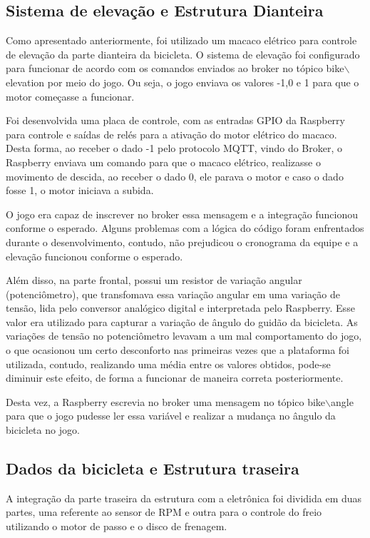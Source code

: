 \subsection{Sistema de elevação e Estrutura Dianteira}

Como apresentado anteriormente, foi utilizado um macaco elétrico para controle de elevação da parte dianteira da bicicleta. O sistema de elevação foi configurado para funcionar de acordo com os comandos enviados ao broker no tópico bike$\backslash$elevation por meio do jogo. Ou seja, o jogo enviava os valores -1,0 e 1 para que o motor começasse a funcionar.

Foi desenvolvida uma placa de controle, com as entradas GPIO da Raspberry para controle e saídas de relés para a ativação do motor elétrico do macaco. Desta forma, ao receber o dado -1 pelo protocolo MQTT, vindo do Broker, o Raspberry enviava um comando para que o macaco elétrico, realizasse o movimento de descida, ao receber o dado 0, ele parava o motor e caso o dado fosse 1, o motor iniciava a subida. 

O jogo era capaz de inscrever no broker essa mensagem e a integração funcionou conforme o esperado. Alguns problemas com a lógica do código foram enfrentados durante o desenvolvimento, contudo, não prejudicou o cronograma da equipe e a elevação funcionou conforme o esperado.

Além disso, na parte frontal, possui um resistor de variação angular (potenciômetro), que transfomava essa variação angular em uma variação de tensão, lida pelo conversor analógico digital e interpretada pelo Raspberry. Esse valor era utilizado para capturar a variação de ângulo do guidão da bicicleta. As variações de tensão no potenciômetro levavam a um mal comportamento do jogo, o que ocasionou um certo desconforto nas primeiras vezes que a plataforma foi utilizada, contudo, realizando uma média entre os valores obtidos, pode-se diminuir este efeito, de forma a funcionar de maneira correta posteriormente.

Desta vez, a Raspberry escrevia no broker uma mensagem no tópico bike$\backslash$angle para que o jogo pudesse ler essa variável e realizar a mudança no ângulo da bicicleta no jogo. 

\subsection{Dados da bicicleta e Estrutura traseira}
   A integração da parte traseira da estrutura com a eletrônica foi dividida em duas partes, uma referente ao sensor de RPM e outra para o controle do freio utilizando o motor de passo e o disco de frenagem.

